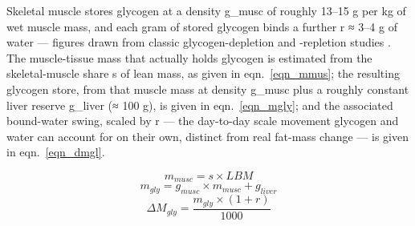 Skeletal muscle stores glycogen at a density g\_musc of roughly 13–15 g per kg of wet muscle mass, and each gram of stored glycogen binds a further r ≈ 3–4 g of water — figures drawn from classic glycogen-depletion and -repletion studies \cite{ref_olsson1970}. The muscle-tissue mass that actually holds glycogen is estimated from the skeletal-muscle share s of lean mass, as given in eqn.~\eqref{eqn_mmus}; the resulting glycogen store, from that muscle mass at density g\_musc plus a roughly constant liver reserve g\_liver (≈ 100 g), is given in eqn.~\eqref{eqn_mgly}; and the associated bound-water swing, scaled by r — the day-to-day scale movement glycogen and water can account for on their own, distinct from real fat-mass change — is given in eqn.~\eqref{eqn_dmgl}.

\begin{equation}
\label{eqn_mmus}
m_{musc} = s × LBM
\end{equation}
\begin{equation}
\label{eqn_mgly}
m_{gly} = g_{musc} × m_{musc} + g_{liver}
\end{equation}
\begin{equation}
\label{eqn_dmgl}
ΔM_{gly} = \frac{m_{gly} × (1 + r)}{1000}
\end{equation}

